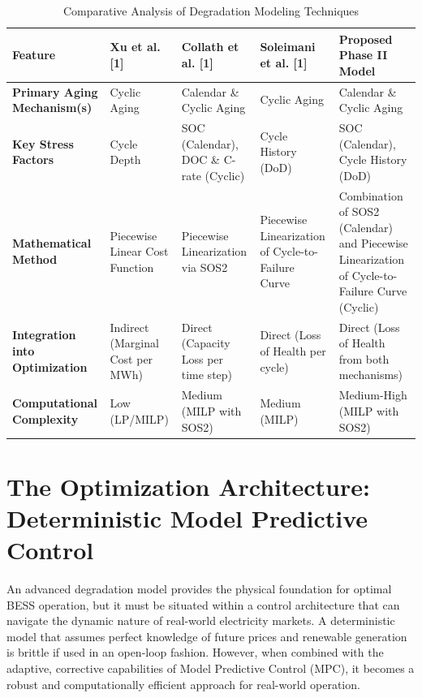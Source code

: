 \begin{table}[h!]
\centering
\caption{Comparative Analysis of Degradation Modeling Techniques}
\label{tab:degradation_comparison}
\begin{tabular}{>{\raggedright}p{} >{\raggedright}p{} >{\raggedright}p{} >{\raggedright}p{} >{\raggedright\arraybackslash}p{}}
\toprule
\textbf{Feature} & \textbf{Xu et al. [1]} & \textbf{Collath et al. [1]} & \textbf{Soleimani et al. [1]} & \textbf{Proposed Phase II Model} \\
\midrule
\textbf{Primary Aging Mechanism(s)} & Cyclic Aging & Calendar \& Cyclic Aging & Cyclic Aging & Calendar \& Cyclic Aging \\
\addlinespace
\textbf{Key Stress Factors} & Cycle Depth & SOC (Calendar), DOC \& C-rate (Cyclic) & Cycle History (DoD) & SOC (Calendar), Cycle History (DoD) \\
\addlinespace
\textbf{Mathematical Method} & Piecewise Linear Cost Function & Piecewise Linearization via SOS2 & Piecewise Linearization of Cycle-to-Failure Curve & Combination of SOS2 (Calendar) and Piecewise Linearization of Cycle-to-Failure Curve (Cyclic) \\
\addlinespace
\textbf{Integration into Optimization} & Indirect (Marginal Cost per MWh) & Direct (Capacity Loss per time step) & Direct (Loss of Health per cycle) & Direct (Loss of Health from both mechanisms) \\
\addlinespace
\textbf{Computational Complexity} & Low (LP/MILP) & Medium (MILP with SOS2) & Medium (MILP) & Medium-High (MILP with SOS2) \\
\bottomrule
\end{tabular}
\end{table}

\section{The Optimization Architecture: Deterministic Model Predictive Control}

An advanced degradation model provides the physical foundation for optimal BESS operation, but it must be situated within a control architecture that can navigate the dynamic nature of real-world electricity markets. A deterministic model that assumes perfect knowledge of future prices and renewable generation is brittle if used in an open-loop fashion. However, when combined with the adaptive, corrective capabilities of Model Predictive Control (MPC), it becomes a robust and computationally efficient approach for real-world operation.


